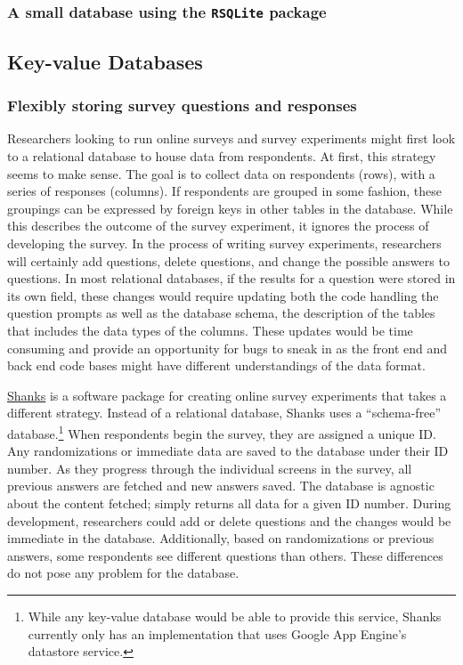 \documentclass[]{article}
\begin{document}
\subsubsection{A small database using the \texttt{RSQLite} package}

\subsection{Key-value Databases}

\subsubsection{Flexibly storing survey questions and responses}

Researchers looking to run online surveys and survey experiments might first
look to a relational database to house data from respondents. At first, this
strategy seems to make sense. The goal is to collect data on respondents
(rows), with a series of responses (columns). If respondents are grouped in
some fashion, these groupings can be expressed by foreign keys in other tables
in the database. While this describes the outcome of the survey experiment, it
ignores the process of developing the survey.
In the process of writing
survey experiments, researchers will certainly add questions, delete
questions, and change the possible answers to questions. In most relational
databases, if the results for a question were stored in its own field, these
changes would require updating both the code handling the question prompts as
well as the database schema, the description of the tables that includes the
data types of the columns. These updates would be time consuming and provide
an opportunity for bugs to sneak in as the front end and back end code bases
might have different understandings of the data format.

\href{https://github.com/markmfredrickson/shanks}{Shanks} is a software
package for creating online survey experiments that takes a different
strategy. Instead of a relational database, Shanks uses a ``schema-free''
database.\footnote{While any key-value database would be able to provide this
service, Shanks currently only has an implementation that uses Google App
Engine's datastore service.} When respondents begin the survey, they are
assigned a unique ID. Any randomizations or immediate data are saved to the
database under their ID number. As they progress through the individual screens in the
survey, all previous answers are fetched and new answers saved. The database
is agnostic about the content fetched; simply returns all data for a given ID
number. During development, researchers could add or delete questions and the
changes would be immediate in the database. Additionally, based on
randomizations or previous answers, some respondents see different questions
than others. These differences do not pose any problem for the database.
\end{document}
